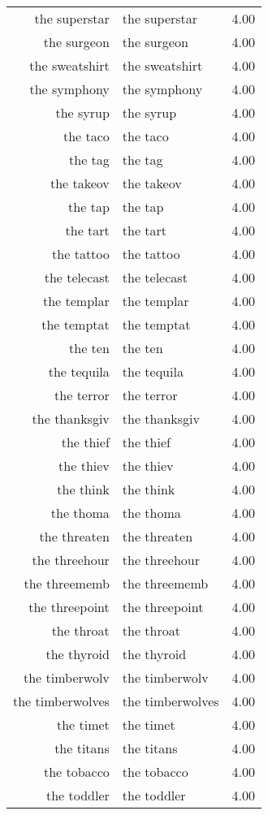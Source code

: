\begin{table}[ht]
\begin{tabular}{rlr}
  the superstar & the superstar & 4.00 \\ 
  the surgeon & the surgeon & 4.00 \\ 
  the sweatshirt & the sweatshirt & 4.00 \\ 
  the symphony & the symphony & 4.00 \\ 
  the syrup & the syrup & 4.00 \\ 
  the taco & the taco & 4.00 \\ 
  the tag & the tag & 4.00 \\ 
  the takeov & the takeov & 4.00 \\ 
  the tap & the tap & 4.00 \\ 
  the tart & the tart & 4.00 \\ 
  the tattoo & the tattoo & 4.00 \\ 
  the telecast & the telecast & 4.00 \\ 
  the templar & the templar & 4.00 \\ 
  the temptat & the temptat & 4.00 \\ 
  the ten & the ten & 4.00 \\ 
  the tequila & the tequila & 4.00 \\ 
  the terror & the terror & 4.00 \\ 
  the thanksgiv & the thanksgiv & 4.00 \\ 
  the thief & the thief & 4.00 \\ 
  the thiev & the thiev & 4.00 \\ 
  the think & the think & 4.00 \\ 
  the thoma & the thoma & 4.00 \\ 
  the threaten & the threaten & 4.00 \\ 
  the threehour & the threehour & 4.00 \\ 
  the threememb & the threememb & 4.00 \\ 
  the threepoint & the threepoint & 4.00 \\ 
  the throat & the throat & 4.00 \\ 
  the thyroid & the thyroid & 4.00 \\ 
  the timberwolv & the timberwolv & 4.00 \\ 
  the timberwolves & the timberwolves & 4.00 \\ 
  the timet & the timet & 4.00 \\ 
  the titans & the titans & 4.00 \\ 
  the tobacco & the tobacco & 4.00 \\ 
  the toddler & the toddler & 4.00 \\ 

\end{tabular}
\end{table}
